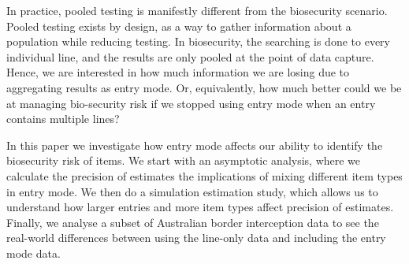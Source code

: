 \documentclass{article}
\begin{document}
In practice, pooled testing is manifestly different from the biosecurity scenario. Pooled testing exists by design, as a way to gather information about a population while reducing testing. In biosecurity, the searching is done to every individual line, and the results are only pooled at the point of data capture. Hence, we are interested in how much information we are losing due to aggregating results as entry mode. Or, equivalently, how much better could we be at managing bio-security risk if we stopped using entry mode when an entry contains multiple lines?

In this paper we investigate how entry mode affects our ability to identify the biosecurity risk of items. We start with an asymptotic analysis, where we calculate the precision of estimates the implications of mixing different item types in entry mode. We then do a simulation estimation study, which allows us to understand how larger entries and more item types affect precision of estimates. Finally, we analyse a subset of Australian border interception data to see the real-world differences between using the line-only data and including the entry mode data.
\end{document}
